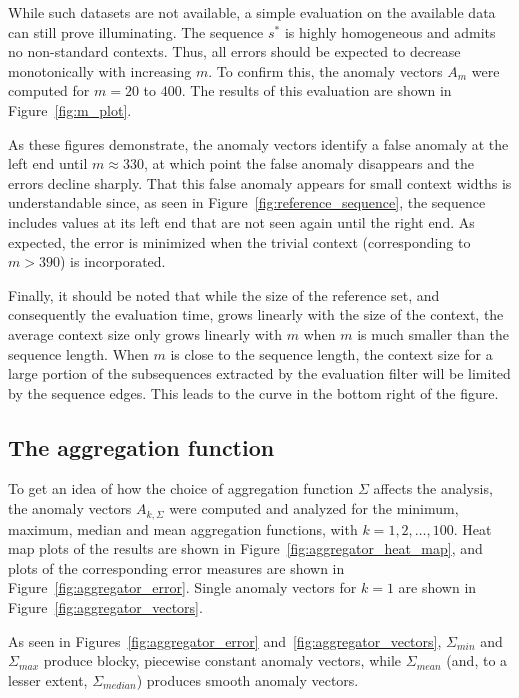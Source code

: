 While such datasets are not available, a simple evaluation on the available data can still prove illuminating. The sequence $s^*$ is highly homogeneous and admits no non-standard contexts. Thus, all errors should be expected to decrease monotonically with increasing $m$. To confirm this, the anomaly vectors $A_m$ were computed for $m = 20$ to $400$. The results of this evaluation are shown in Figure~\ref{fig:m_plot}.

As these figures demonstrate, the anomaly vectors identify a false anomaly at the left end until $m \approx 330$, at which point the false anomaly disappears and the errors decline sharply. That this false anomaly appears for small context widths is understandable since, as seen in Figure~\ref{fig:reference_sequence}, the sequence includes values at its left end that are not seen again until the right end. As expected, the error is minimized when the trivial context (corresponding to $m > 390$) is incorporated.

Finally, it should be noted that while the size of the reference set, and consequently the evaluation time, grows linearly with the size of the context, the average context size only grows linearly with $m$ when $m$ is much smaller than the sequence length. When $m$ is close to the sequence length, the context size for a large portion of the subsequences extracted by the evaluation filter will be limited by the sequence edges. This leads to the curve in the bottom right of the figure.

\subsection{The aggregation function}
\label{sect:A}

To get an idea of how the choice of aggregation function $\Sigma$ affects the analysis, the anomaly vectors $A_{k, \Sigma}$ were computed and analyzed for the minimum, maximum, median and mean aggregation functions, with $k = 1,2,\dots,100$. Heat map plots of the results are shown in Figure~\ref{fig:aggregator_heat_map}, and plots of the corresponding error measures are shown in Figure~\ref{fig:aggregator_error}. Single anomaly vectors for $k=1$ are shown in Figure~\ref{fig:aggregator_vectors}.

As seen in Figures~\ref{fig:aggregator_error} and~\ref{fig:aggregator_vectors}, $\Sigma_{min}$ and $\Sigma_{max}$ produce blocky, piecewise constant anomaly vectors, while $\Sigma_{mean}$ (and, to a lesser extent, $\Sigma_{median}$) produces smooth anomaly vectors.

